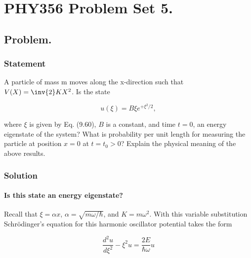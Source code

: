 %
%
%
%


\chapter{PHY356 Problem Set 5.}
\label{chap:qmIproblemSet5}
\date{Nov 25, 2010}

\beginArtNoToc
\section{Problem.}
\subsection{Statement}

A particle of mass m moves along the x-direction such that $V(X)=\inv{2}KX^2$. Is the state 

\begin{equation}\label{eqn:qmIproblemSet5:5}
u(\xi) = B \xi e^{+\xi^2/2},
\end{equation}

where $\xi$ is given by Eq. (9.60), $B$ is a constant, and time $t=0$, an energy eigenstate of the system?  What is probability per unit length for measuring the particle at position $x=0$ at $t=t_0>0$?  Explain the physical meaning of the above results.

\subsection{Solution}
\subsubsection{Is this state an energy eigenstate?}

Recall that $\xi = \alpha x$, $\alpha = \sqrt{m\omega/\hbar}$, and $K = m \omega^2$.  With this variable substitution Schr\"{o}dinger's equation for this harmonic oscillator potential takes the form

\begin{equation}\label{eqn:qmIproblemSet5:10}
\frac{d^2 u}{d\xi^2} - \xi^2 u = \frac{2 E }{\hbar\omega} u
\end{equation}

